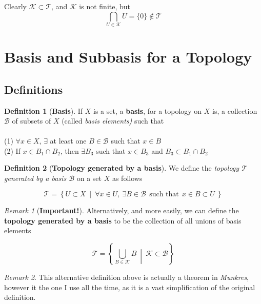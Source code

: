 \documentclass{article}
\theoremstyle{remark}
\newtheorem*{remark}{Remark}
\theoremstyle{definition}
\newtheorem{definition}{Definition}[section]
\begin{document}
Clearly $\mathcal{K} \subset \mathcal{T}$, and $\mathcal{K}$ is not finite, but $$\bigcap_{U \in \mathcal{K}} U = \{0\} \not\in \mathcal{T}$$

\newpage


\section{Basis and Subbasis for a Topology}

\bigskip

\subsection{Definitions}

\begin{definition}[\textbf{Basis}]
If $X$ is a set, a \textbf{basis}, for a topology on $X$ is, a collection $\mathcal{B}$ of subsets of $X$ (called \textit{basis elements)} such that 
\\ \\ 
(1) $\forall x \in X$, $\exists$ at least one $B \in \mathcal{B}$ such that $x \in B$ \\
(2) If $x \in B_1 \cap B_2$, then $\exists B_3$ such that $x \in B_3$ and $B_3 \subset B_1 \cap B_2$
\end{definition}

\bigskip

\begin{definition}[\textbf{Topology generated by a basis}]
We define the \textit{topology $\mathcal{T}$ generated by a basis $\mathcal{B}$} on a set $X$ as follows

$$\mathcal{T} = \left\{ U \subset X \ \middle| \ \forall x \in U, \ \exists B \in \mathcal{B} \ \ \text{such  that} \ \ x \in B \subset U\ \right\}$$
\end{definition}

\medskip

\begin{remark}[\textbf{Important!}]
Alternatively, and more easily, we can define the \textbf{topology generated by a basis} to be the collection of all unions of basis elements

$$\mathcal{T} = \left\{ \bigcup_{B \in \mathcal{K}} B \ \middle| \ \mathcal{K} \subset \mathcal{B} \right\}$$
\end{remark}
\medskip
\begin{remark}
This alternative definition above is actually a theorem in \textit{Munkres}, however it the one I use all the time, as it is a vast simplification of the original definition.
\end{remark}
\end{document}
